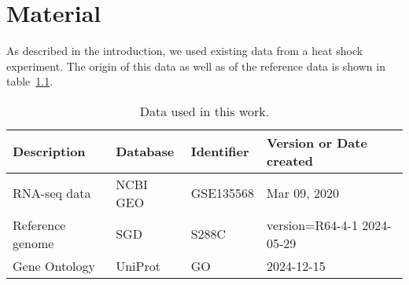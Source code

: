 \chapter{Material}

As described in the introduction, we used existing data from a heat shock experiment. 
The origin of this data as well as of the reference data is shown in 
table~\ref{tab:Material}.

\begin{table}[H]
  \center
  \caption{Data used in this work.}\label{tab:Material}
  \begin{tabular}{llll}
    \toprule
    
    Description & Database & Identifier & Version or Date created \\
    \midrule
    RNA-seq data & NCBI GEO & GSE135568 &  Mar 09, 2020\\
    Reference genome & SGD & S288C & version=R64-4-1 2024-05-29 \\ 
    Gene Ontology & UniProt & GO & 2024-12-15 \\
    \bottomrule
  \end{tabular}
\end{table}

